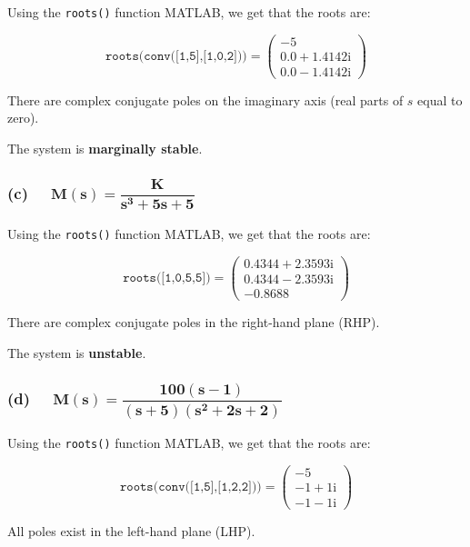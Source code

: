 \documentclass[12pt, letterpaper]{../assignment}
\begin{document}
Using the \texttt{roots()} function MATLAB, we get that the roots are:

$$ \texttt{roots(conv([1,5],[1,0,2]))} = \left(\begin{array}{c} -5\\ 0.0+1.4142{}\mathrm{i}\\ 0.0-1.4142{}\mathrm{i} \end{array}\right)$$

There are complex conjugate poles on the imaginary axis (real parts of $s$ equal to zero).

\begin{answer}
    The system is \textbf{marginally stable}.
\end{answer}

\subsubsection*{(c) \ \  $ \mathbf{ M(s) = \dfrac{K }{s^3 + 5s + 5}}$}

Using the \texttt{roots()} function MATLAB, we get that the roots are:

$$ \texttt{roots([1,0,5,5])} = \left(\begin{array}{c} 0.4344+2.3593{}\mathrm{i}\\ 0.4344-2.3593{}\mathrm{i}\\ -0.8688 \end{array}\right)$$

There are complex conjugate poles in the right-hand plane (RHP).

\begin{answer}
    The system is \textbf{unstable}.
\end{answer}

\subsubsection*{(d) \ \ $ \mathbf{ M(s) = \dfrac{100(s-1)}{(s+5)(s^2 + 2s + 2)}}$}

Using the \texttt{roots()} function MATLAB, we get that the roots are:

$$ \texttt{roots(conv([1,5],[1,2,2]))} = \left(\begin{array}{c} -5\\ -1+1{}\mathrm{i}\\ -1-1{}\mathrm{i} \end{array}\right)$$

All poles exist in the left-hand plane (LHP).
\end{document}
